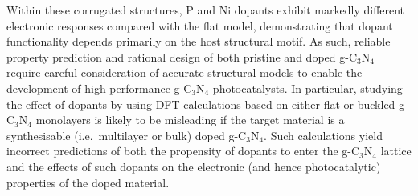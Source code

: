 Within these corrugated structures, P and Ni dopants exhibit markedly different electronic responses compared with the flat model, demonstrating that dopant functionality depends primarily on the host structural motif. As such, reliable property prediction and rational design of both pristine and doped g-C$_3$N$_4$ require careful consideration of accurate structural models to enable the development of high-performance g-C$_3$N$_4$ photocatalysts.
In particular, studying the effect of dopants by using DFT calculations based on either flat or buckled g-C$_3$N$_4$ monolayers is likely to be misleading if the target material is a synthesisable (i.e.\ multilayer or bulk) doped g-C$_3$N$_4$.  Such calculations yield incorrect predictions of both the propensity of dopants to enter the g-C$_3$N$_4$ lattice and the effects of such dopants on the electronic (and hence photocatalytic) properties of  the doped material.






